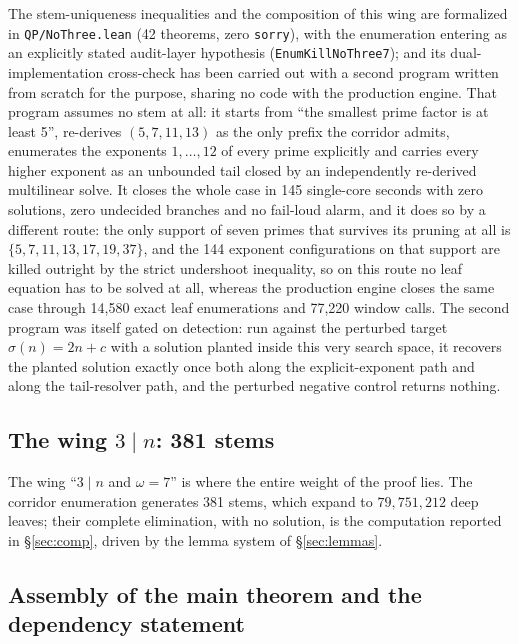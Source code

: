 \documentclass[11pt]{article}
\theoremstyle{remark}
\begin{document}
The stem-uniqueness inequalities and the composition of this wing are formalized in \texttt{QP/NoThree.lean} (42 theorems, zero \texttt{sorry}), with the enumeration entering as an explicitly stated audit-layer hypothesis (\texttt{EnumKillNoThree7}); and its dual-implementation cross-check has been carried out with a second program written from scratch for the purpose, sharing no code with the production engine. That program assumes no stem at all: it starts from ``the smallest prime factor is at least 5'', re-derives $(5,7,11,13)$ as the only prefix the corridor admits, enumerates the exponents $1, \dots, 12$ of every prime explicitly and carries every higher exponent as an unbounded tail closed by an independently re-derived multilinear solve. It closes the whole case in 145 single-core seconds with zero solutions, zero undecided branches and no fail-loud alarm, and it does so by a different route: the only support of seven primes that survives its pruning at all is $\{5, 7, 11, 13, 17, 19, 37\}$, and the 144 exponent configurations on that support are killed outright by the strict undershoot inequality, so on this route no leaf equation has to be solved at all, whereas the production engine closes the same case through 14,580 exact leaf enumerations and 77,220 window calls. The second program was itself gated on detection: run against the perturbed target $\sigma(n) = 2n + c$ with a solution planted inside this very search space, it recovers the planted solution exactly once both along the explicit-exponent path and along the tail-resolver path, and the perturbed negative control returns nothing.

\subsection{The wing $3 \mid n$: 381 stems}\label{sec:threemid}

The wing ``$3 \mid n$ and $\omega = 7$'' is where the entire weight of the proof lies. The corridor enumeration generates 381 stems, which expand to $79{,}751{,}212$ deep leaves; their complete elimination, with no solution, is the computation reported in \S\ref{sec:comp}, driven by the lemma system of \S\ref{sec:lemmas}.

\subsection{Assembly of the main theorem and the dependency statement}\label{sec:proofmain}
\end{document}
